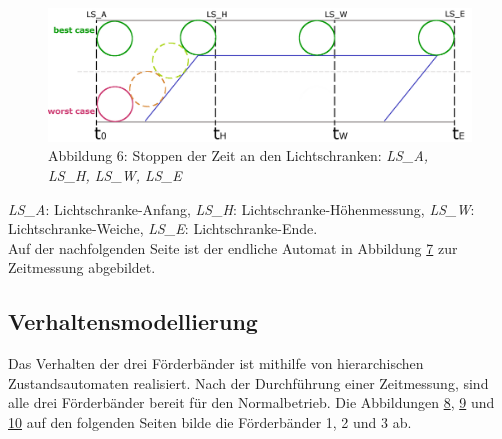 \documentclass[a4paper, 11pt]{article}
\begin{document}
\begin{figure}[h]
\centering 
\includegraphics[scale=0.6]{images/Zeitmessung_Platzierung.png}
\caption*{Abbildung 6: Stoppen der Zeit an den Lichtschranken: \textit{LS\_A, LS\_H, LS\_W, LS\_E}}
\label{sec:Messpunkte}
\end{figure}
\noindent \textit{LS\_A}: Lichtschranke-Anfang, 
\textit{LS\_H}: Lichtschranke-Höhenmessung, 
\textit{LS\_W}: Lichtschranke-Weiche, 
\textit{LS\_E}: Lichtschranke-Ende.\\

\noindent Auf der nachfolgenden Seite ist der endliche Automat in Abbildung \hyperref[sec:timemeasure]{7} zur Zeitmessung abgebildet.

\label{sec:timemeasure}

\newpage

\subsection{Verhaltensmodellierung}
Das Verhalten der drei Förderbänder ist mithilfe von hierarchischen Zustandsautomaten realisiert. Nach der Durchführung einer Zeitmessung, sind alle drei Förderbänder bereit für den Normalbetrieb. Die Abbildungen \hyperref[sec:hsm1]{8}, \hyperref[sec:hsm2]{9} und \hyperref[sec:hsm3]{10} auf den folgenden Seiten bilde die Förderbänder 1, 2 und 3 ab.

\newpage

\label{sec:hsm1}

\newpage

\label{sec:hsm2}
\end{document}
